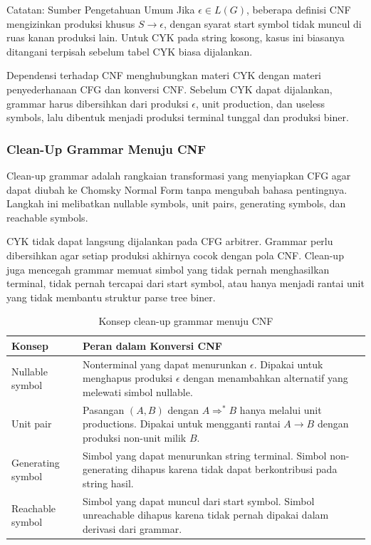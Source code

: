\begin{cmt}{Catatan: Sumber Pengetahuan Umum}{}
Jika $\epsilon\in L(G)$, beberapa definisi CNF mengizinkan produksi khusus $S\rightarrow\epsilon$, dengan syarat start symbol tidak muncul di ruas kanan produksi lain. Untuk CYK pada string kosong, kasus ini biasanya ditangani terpisah sebelum tabel CYK biasa dijalankan.
\end{cmt}

Dependensi terhadap CNF menghubungkan materi CYK dengan materi penyederhanaan CFG dan konversi CNF. Sebelum CYK dapat dijalankan, grammar harus dibersihkan dari produksi $\epsilon$, unit production, dan useless symbols, lalu dibentuk menjadi produksi terminal tunggal dan produksi biner.

\subsubsection{Clean-Up Grammar Menuju CNF}

\begin{jawab}
Clean-up grammar adalah rangkaian transformasi yang menyiapkan CFG agar dapat diubah ke Chomsky Normal Form tanpa mengubah bahasa pentingnya. Langkah ini melibatkan nullable symbols, unit pairs, generating symbols, dan reachable symbols.
\end{jawab}

CYK tidak dapat langsung dijalankan pada CFG arbitrer. Grammar perlu dibersihkan agar setiap produksi akhirnya cocok dengan pola CNF. Clean-up juga mencegah grammar memuat simbol yang tidak pernah menghasilkan terminal, tidak pernah tercapai dari start symbol, atau hanya menjadi rantai unit yang tidak membantu struktur parse tree biner.

\begin{table}[H]
\centering
\begin{tabularx}{\textwidth}{|L{0.24\textwidth}|X|}
\hline
\textbf{Konsep} & \textbf{Peran dalam Konversi CNF} \\
\hline
Nullable symbol & Nonterminal yang dapat menurunkan $\epsilon$. Dipakai untuk menghapus produksi $\epsilon$ dengan menambahkan alternatif yang melewati simbol nullable. \\
\hline
Unit pair & Pasangan $(A,B)$ dengan $A\Rightarrow^* B$ hanya melalui unit productions. Dipakai untuk mengganti rantai $A\rightarrow B$ dengan produksi non-unit milik $B$. \\
\hline
Generating symbol & Simbol yang dapat menurunkan string terminal. Simbol non-generating dihapus karena tidak dapat berkontribusi pada string hasil. \\
\hline
Reachable symbol & Simbol yang dapat muncul dari start symbol. Simbol unreachable dihapus karena tidak pernah dipakai dalam derivasi dari grammar. \\
\hline
\end{tabularx}
\caption{Konsep clean-up grammar menuju CNF}
\label{tab:cleanup-cnf}
\end{table}

